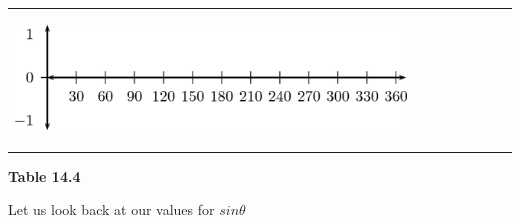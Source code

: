 \begin{center}
\begin{xtabular*}{\mytablewidth}[t]{|p{10\mystarwidth}|p{10\mystarwidth}|p{10\mystarwidth}|p{10\mystarwidth}|p{10\mystarwidth}|p{10\mystarwidth}|p{10\mystarwidth}|p{10\mystarwidth}|}
{\begin{center}
\label{m39414*id84030!!!underscore!!!media}\label{m39414*id84030!!!underscore!!!printimage}\includegraphics{col11306.imgs/m39414_MG10C15_016.png} %
\vspace{2pt}
\vspace{.1in}
\end{center}    
  }
\tabularnewline{}
\end{xtabular*}
\end{center}
\begin{center}{\small\bfseries Table 14.4}\end{center}
\par
\label{m39414*id84056}Let us look back at our values for $sin\theta $\par 
